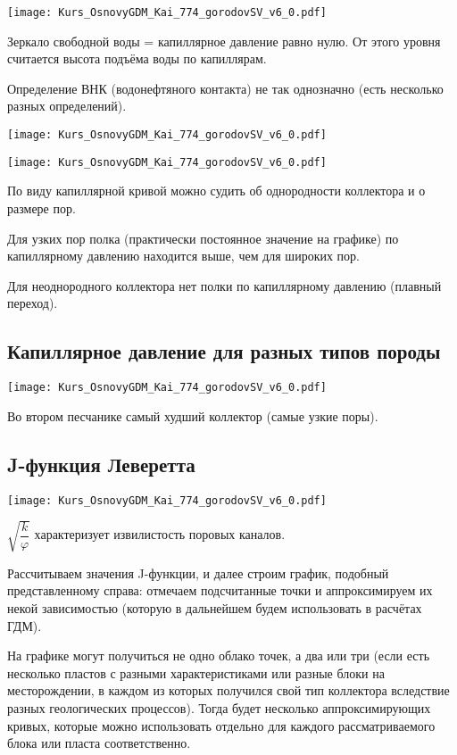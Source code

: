 \documentclass[main.tex]{subfiles}
\begin{document}
\texttt{[image: Kurs\_OsnovyGDM\_Kai\_774\_gorodovSV\_v6\_0.pdf]}

Зеркало свободной воды = капиллярное давление равно нулю.
От этого уровня считается высота подъёма воды по капиллярам.

Определение ВНК (водонефтяного контакта) не так однозначно (есть несколько разных определений).

\texttt{[image: Kurs\_OsnovyGDM\_Kai\_774\_gorodovSV\_v6\_0.pdf]}

\texttt{[image: Kurs\_OsnovyGDM\_Kai\_774\_gorodovSV\_v6\_0.pdf]}

По виду капиллярной кривой можно судить об однородности коллектора и о размере пор.

Для узких пор полка (практически постоянное значение на графике) по капиллярному давлению находится выше, чем для широких пор.

Для неоднородного коллектора нет полки по капиллярному давлению (плавный переход).

\subsection{Капиллярное давление для разных типов породы}

\texttt{[image: Kurs\_OsnovyGDM\_Kai\_774\_gorodovSV\_v6\_0.pdf]}

Во втором песчанике самый худший коллектор (самые узкие поры).

\subsection{J-функция Леверетта}

\texttt{[image: Kurs\_OsnovyGDM\_Kai\_774\_gorodovSV\_v6\_0.pdf]}

$\sqrt{\dfrac{k}{\varphi}}$ характеризует извилистость поровых каналов.

Рассчитываем значения J-функции, и далее строим график, подобный представленному справа: отмечаем подсчитанные точки и аппроксимируем их некой зависимостью (которую в дальнейшем будем использовать в расчётах ГДМ).

На графике могут получиться не одно облако точек, а два или три (если есть несколько пластов с разными характеристиками или разные блоки на месторождении, в каждом из которых получился свой тип коллектора вследствие разных геологических процессов).
Тогда будет несколько аппроксимирующих кривых, которые можно использовать отдельно для каждого рассматриваемого блока или пласта соответственно.
\end{document}
